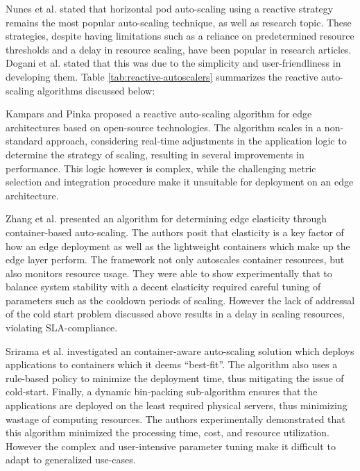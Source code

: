 Nunes et al. \cite{nunes2021state} stated that horizontal pod auto-scaling using a reactive strategy remains the most popular auto-scaling technique, as well as research topic. These strategies, despite having limitations such as a reliance on predetermined resource thresholds and a delay in resource scaling, have been popular in research articles.  Dogani et al. \cite{dogani2023auto} stated that this was due to the simplicity and user-friendliness in developing them. Table \ref{tab:reactive-autoscalers} summarizes the reactive auto-scaling algorithms discussed below:\par

Kampars and Pinka \cite{kampars2017auto} proposed a reactive auto-scaling algorithm for edge architectures based on open-source technologies. The algorithm scales in a non-standard approach, considering real-time adjustments in the application logic to determine the strategy of scaling, resulting in several improvements in performance. This logic however is complex, while the challenging metric selection and integration procedure make it unsuitable for deployment on an edge architecture.\par

Zhang et al. \cite{zhang2019quantifying} presented an algorithm for determining edge elasticity through container-based auto-scaling. The authors posit that elasticity is a key factor of how an edge deployment as well as the lightweight containers which make up the edge layer perform. The framework not only autoscales container resources, but also monitors resource usage. They were able to show experimentally that to balance system stability with a decent elasticity required careful tuning of parameters such as the cooldown periods of scaling. However the lack of addressal of the cold start problem discussed above results in a delay in scaling resources, violating SLA-compliance.\par

Srirama et al. \cite{srirama2020application} investigated an container-aware auto-scaling solution which deploys applications to containers which it deems ``best-fit''. The algorithm also uses a rule-based policy to minimize the deployment time, thus mitigating the issue of cold-start. Finally, a dynamic bin-packing sub-algorithm ensures that the applications are deployed on the least required physical servers, thus minimizing wastage of computing resources. The authors experimentally demonstrated that this algorithm minimized  the processing time, cost, and resource utilization. However the complex and user-intensive parameter tuning make it difficult to adapt to generalized use-cases.\par


